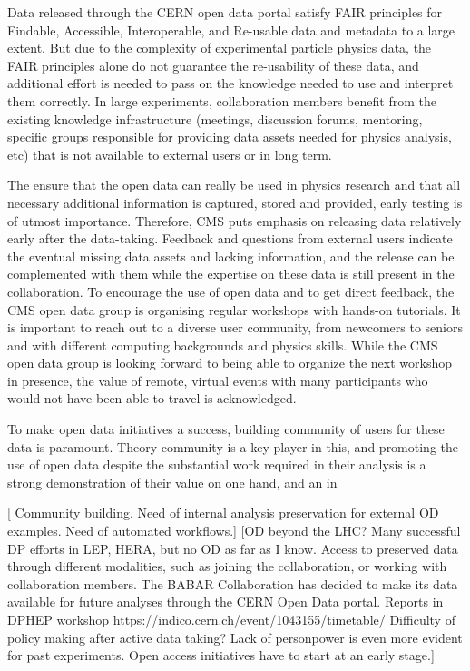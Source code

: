 \documentclass[11pt]{article}
\begin{document}
Data released through the CERN open data portal satisfy FAIR principles for Findable, Accessible, Interoperable, and Re-usable data and metadata to a large extent. But due to the complexity of experimental particle physics data, the FAIR principles alone do not guarantee the re-usability of these data, and additional effort is needed to pass on the knowledge needed to use and interpret them correctly. In large experiments, collaboration members benefit from the existing knowledge infrastructure (meetings, discussion forums, mentoring, specific groups responsible for providing data assets needed for physics analysis, etc) that is not available to external users or in long term. 


The ensure that the open data can really be used in physics research and that all necessary additional information is captured, stored and provided, early testing is of utmost importance. Therefore, CMS puts emphasis on releasing data relatively early after the data-taking. Feedback and questions from external users indicate the eventual missing data assets and lacking information, and the release can be complemented with them while the expertise on these data is still present in the collaboration. To encourage the use of open data and to get direct feedback, the CMS open data group is organising regular workshops with hands-on tutorials. It is important to reach out to a diverse user community, from newcomers to seniors and with different computing backgrounds and physics skills. While the CMS open data group is looking forward to being able to organize the next workshop in presence, the value of remote, virtual events with many participants who would not have been able to travel is acknowledged.

To make open data initiatives a success, building community of users for these data is paramount. Theory community is a key player in this, and promoting the use of open data despite the substantial work required in their analysis is a strong demonstration of their value on one hand, and an in

[ Community building.  Need of internal analysis preservation for external OD examples. Need of automated workflows.]
[OD beyond the LHC? Many successful DP efforts in LEP, HERA, but no OD as far as I know. Access to preserved data through different modalities, such as joining the collaboration, or working with collaboration members. The BABAR Collaboration has decided to make its data available for future analyses through the CERN Open Data portal. Reports in DPHEP workshop https://indico.cern.ch/event/1043155/timetable/ Difficulty of policy making after active data taking? Lack of personpower is even more evident for past experiments. Open access initiatives have to start at an early stage.]
\end{document}
